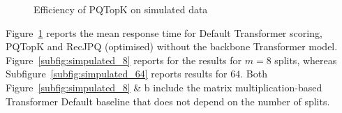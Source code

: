 \documentclass[sigconf,natbib=true, review=true]{acmart} %
\begin{document}
\begin{figure}
    \centering

    \caption{Efficiency of PQTopK on simulated data}
    \label{fig:simulate_effectiveness}
\end{figure}

Figure~\ref{fig:simulate_effectiveness} reports the mean response time for Default Transformer scoring, PQTopK and RecJPQ (optimised) without the backbone Transformer model. Figure~\ref{subfig:simpulated_8} reports for the results for $m=8$ splits, whereas Subfigure~\ref{subfig:simpulated_64} reports results for $64$. Both Figure~\ref{subfig:simpulated_8} \& b include the matrix multiplication-based Transformer Default baseline that does not depend on the number of splits. 
\end{document}
